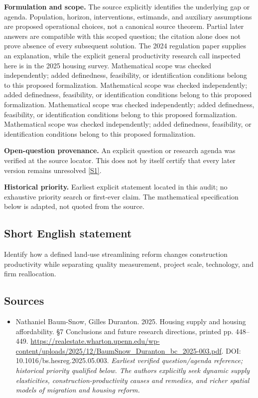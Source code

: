 \documentclass[11pt]{article}
\newcommand{\sref}[2]{\hyperlink{source:#1:#2}{[S#2]}}
\begin{document}
\par\textbf{Formulation and scope.} The source explicitly identifies the underlying gap or agenda. Population, horizon, interventions, estimands, and auxiliary assumptions are proposed operational choices, not a canonical source theorem. Partial later answers are compatible with this scoped question; the citation alone does not prove absence of every subsequent solution. The 2024 regulation paper supplies an explanation, while the explicit general productivity research call inspected here is in the 2025 housing survey. Mathematical scope was checked independently; added definedness, feasibility, or identification conditions belong to this proposed formalization. Mathematical scope was checked independently; added definedness, feasibility, or identification conditions belong to this proposed formalization. Mathematical scope was checked independently; added definedness, feasibility, or identification conditions belong to this proposed formalization. Mathematical scope was checked independently; added definedness, feasibility, or identification conditions belong to this proposed formalization.

\par\textbf{Open-question provenance.} An explicit question or research agenda was verified at the source locator. This does not by itself certify that every later version remains unresolved \sref{30007744}{1}.

\par\textbf{Historical priority.} Earliest explicit statement located in this audit; no exhaustive priority search or first-ever claim. The mathematical specification below is adapted, not quoted from the source.

\subsection{Short English statement}
Identify how a defined land-use streamlining reform changes construction productivity while separating quality measurement, project scale, technology, and firm reallocation.

\subsection{Sources}
\begin{itemize}\raggedright
\item[\textnormal{[S1]}]\hypertarget{source:30007744:1}{} Nathaniel Baum-Snow, Gilles Duranton. 2025. Housing supply and housing affordability. §7 Conclusions and future research directions, printed pp. 448–449.
\url{https://realestate.wharton.upenn.edu/wp-content/uploads/2025/12/BaumSnow_Duranton_bc_2025-003.pdf}.
DOI: 10.1016/bs.hesreg.2025.05.003.
{\small\textit{Earliest verified question/agenda reference; historical priority qualified below. The authors explicitly seek dynamic supply elasticities, construction-productivity causes and remedies, and richer spatial models of migration and housing reform.}}
\end{itemize}
\end{document}

